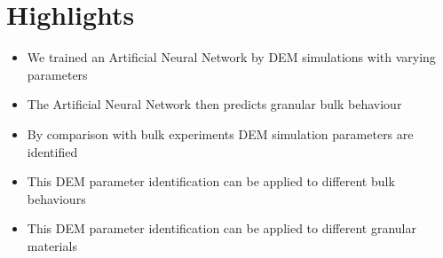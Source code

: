 \section{Highlights}
\label{sec:highlights}
\begin{itemize}
  \item{We trained an Artificial Neural Network by DEM simulations with varying
  parameters}
  \item{The Artificial Neural Network then predicts granular bulk behaviour}
  \item{By comparison with bulk experiments DEM simulation parameters are
  identified}
  \item{This DEM parameter identification can be applied to different bulk
  behaviours}
  \item{This DEM parameter identification can be applied to different granular
  materials}
\end{itemize}